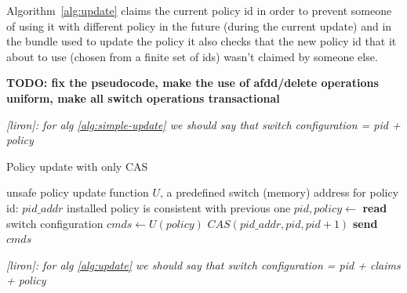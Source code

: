 \documentclass[conference]{sigcomm-alternate}
\newcommand{\hide}[1]{}
\newcommand{\liron}[1]{\textit{\textcolor{mygreen}{[liron]: #1}}} %
\begin{document}
Algorithm~\ref{alg:update} claims the current policy id in order to prevent someone of using it with different policy in the future (during the current update) and in the bundle used to update the policy it also checks that the new policy id that it about to use (chosen from a finite set of ids) wasn't claimed by someone else.

\hide{
We compute our new suggested policy by applying the update requests on top of current policy, supporting any kind of requests and policies. Then we make a transaction (using the bundle feature) to atomically check that our policy id is not blocked by anyone else, to change the current policy id to ours (an action that would fail if the current policy id is no longer what we are counting of) and to actually configure our new policy.

If one of the actions in the transaction fails we try again. There is no progress guaranty for each controller but there is one for the whole system - at least one of the controller will succeed in fulfilling its update requirements.
}



\textbf{TODO: fix the pseudocode, make the use of afdd/delete
  operations uniform, make all switch operations transactional}

\liron{for alg \ref{alg:simple-update} we should say that switch configuration = pid + policy}

\begin{algorithm}[t]
    \caption{Policy update with only CAS}
    \label{alg:simple-update}
    \begin{algorithmic}[1]
    \Require unsafe policy update function $U$, a predefined switch (memory) address for policy id: $pid\_addr$
    \Ensure installed policy is consistent with previous one
 		\Repeat
 			\State $pid,policy\gets$ \textbf{read} switch configuration
 			\State $cmds\gets U(policy)$
 			\startTxn
	 			\State $CAS(pid\_addr,pid,pid+1)$
	 			\State \textbf{send} $cmds$ %
 			\endTxn
			\Return

    \end{algorithmic}
\end{algorithm}


\liron{for alg \ref{alg:update} we should say that switch configuration = pid + claims + policy}
\end{document}
